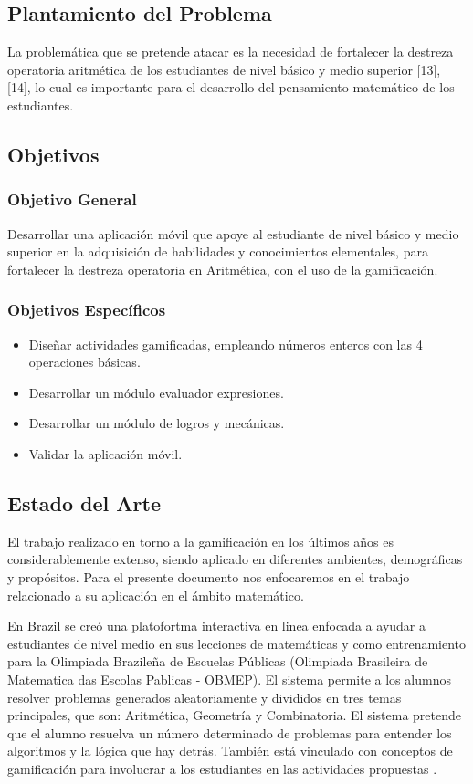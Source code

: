 \documentclass{article}
\begin{document}
\subsection{Plantamiento del Problema}
La problemática que se pretende atacar es la necesidad de fortalecer la destreza operatoria aritmética de los estudiantes de nivel básico y  medio superior [13], [14], lo cual es importante para el desarrollo del pensamiento matemático de los estudiantes. 
\subsection{Objetivos}
\subsubsection{Objetivo General}Desarrollar una aplicación móvil que apoye al estudiante de nivel básico y  medio superior en la 
adquisición de habilidades y conocimientos elementales, para fortalecer la destreza 
operatoria en  Aritmética, con el uso de la gamificación.

\subsubsection{Objetivos Específicos}
\begin{itemize}
	\item Diseñar actividades gamificadas, empleando números enteros con las 4 operaciones básicas.
	\item Desarrollar un módulo evaluador expresiones.
	\item Desarrollar un módulo de logros y mecánicas.
	\item Validar la aplicación móvil. 
\end{itemize}
\subsection{Estado del Arte}
El trabajo realizado en torno a la gamificación en los últimos años es considerablemente extenso, siendo aplicado en diferentes ambientes, demográficas y propósitos. Para el presente documento nos enfocaremos en el trabajo relacionado a su aplicación en el ámbito matemático.

En Brazil se creó una platofortma interactiva en linea enfocada a ayudar a estudiantes de nivel medio en sus lecciones de matemáticas y como entrenamiento para la Olimpiada Brazileña de Escuelas Públicas (Olimpiada Brasileira de Matematica das Escolas Pablicas - OBMEP). El sistema permite a los alumnos resolver problemas generados aleatoriamente y divididos en tres temas principales, que son: Aritmética, Geometría y Combinatoria. El sistema pretende que el alumno resuelva un número determinado de problemas para entender los algoritmos y la lógica que hay detrás. También está vinculado con conceptos de gamificación para involucrar a los estudiantes en las actividades propuestas \cite{toda2014project}.
\end{document}

